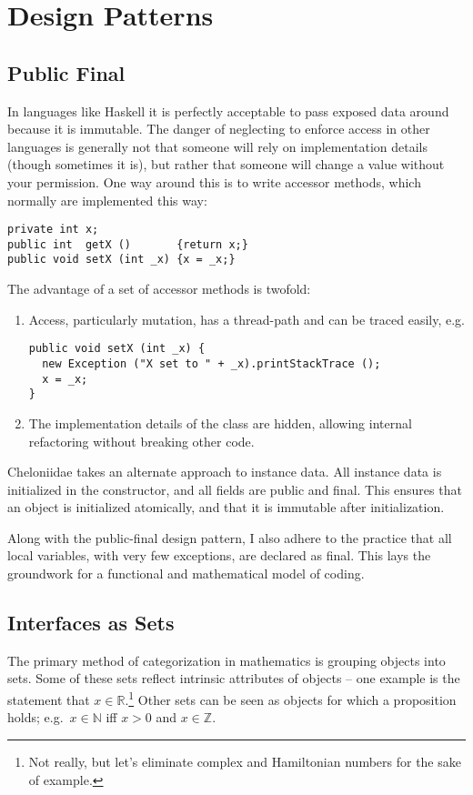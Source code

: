 \documentclass{report}
\begin{document}
\chapter {Design Patterns} \label{sec:design-patterns}
\section {Public Final} \label{sec:public-final}
      In languages like Haskell it is perfectly acceptable to pass exposed data around because it is immutable. The danger of neglecting to enforce access in
      other languages is generally not that someone will rely on implementation details (though sometimes it is), but rather that someone will change a value
      without your permission. One way around this is to write accessor methods, which normally are implemented this way:

\begin{verbatim}
private int x;
public int  getX ()       {return x;}
public void setX (int _x) {x = _x;}
\end{verbatim}

      The advantage of a set of accessor methods is twofold:

\begin{enumerate}
\item Access, particularly mutation, has a thread-path and can be traced easily, e.g.
\begin{verbatim}
public void setX (int _x) {
  new Exception ("X set to " + _x).printStackTrace ();
  x = _x;
}
\end{verbatim}

\item The implementation details of the class are hidden, allowing internal refactoring without breaking other code.
\end{enumerate}

      Cheloniidae takes an alternate approach to instance data. All instance data is initialized in the constructor, and all fields are public and final. This
      ensures that an object is initialized atomically, and that it is immutable after initialization.

      Along with the public-final design pattern, I also adhere to the practice that all local variables, with very few exceptions, are declared as final. This
      lays the groundwork for a functional and mathematical model of coding.

\section {Interfaces as Sets} \label{sec:interfaces-as-sets}
      The primary method of categorization in mathematics is grouping objects into sets. Some of these sets reflect intrinsic attributes of objects -- one
      example is the statement that $x \in \mathbb R$.\footnote{Not really, but let's eliminate complex and Hamiltonian numbers for the sake of example.} Other
      sets can be seen as objects for which a proposition holds; e.g.~$x \in \mathbb N$ iff $x > 0$ and $x \in \mathbb Z$.
\end{document}
